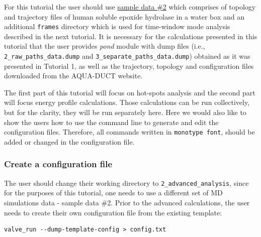 \documentclass[9pt,tutorial]{livecoms}
\begin{document}
For this tutorial the user should use \href{http://www.aquaduct.pl/sample-data/}{sample data \#2} which comprises of topology and trajectory files of human soluble epoxide hydrolase in a water box and an additional \texttt{frames} directory which is used for time-window mode analysis described in the next tutorial. It is necessary for the calculations presented in this tutorial that the user provides \textit{pond} module with dump files (i.e., \texttt{2\_raw\_paths\_data.dump} and \texttt{3\_separate\_paths\_data.dump}) obtained as it was presented in Tutorial 1, as well as the trajectory, topology and configuration files downloaded from the AQUA-DUCT website.

The first part of this tutorial will focus on hot-spots analysis and the second part will focus energy profile calculations. Those calculations can be run collectively, but for the clarity, they will be run separately here. Here we would also like to show the users how to use the command line to generate and edit the configuration files. Therefore, all commands written in \texttt{monotype font}, should be added or changed in the configuration file.

\subsubsection{Create a configuration file}
The user should change their working directory to \texttt{2\_advanced\_analysis}, since for the purposes of this tutorial, one needs to use a different set of MD simulations data - sample data \#2. Prior to the advanced calculations, the user needs to create their own configuration file from the existing template:
\begin{lstlisting}
valve_run --dump-template-config > config.txt
\end{lstlisting}
\end{document}
